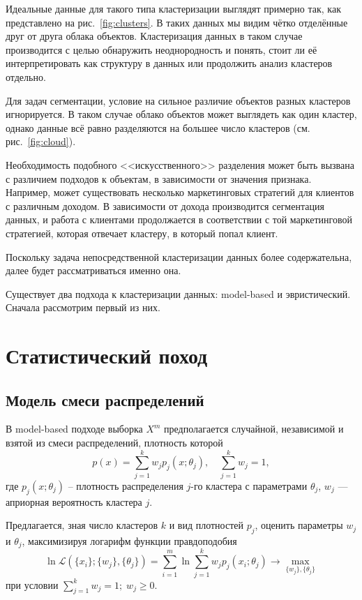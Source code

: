 \documentclass[10pt]{article}
\renewcommand{\geq}{\geqslant}
\begin{document}
Идеальные данные для такого типа кластеризации выглядят примерно так, как представлено на рис.~\ref{fig:clusters}. 
В таких данных мы видим чётко отделённые друг от друга облака объектов. Кластеризация данных в таком случае производится с целью обнаружить неоднородность и
понять, стоит ли её интерпретировать как структуру в данных или продолжить анализ кластеров отдельно.

Для задач сегментации, условие на сильное различие объектов разных кластеров игнорируется. В таком случае облако объектов может выглядеть как один кластер, 
однако данные всё равно разделяются на большее число кластеров (см. рис.~\ref{fig:cloud}). 

Необходимость подобного <<искусственного>> разделения может быть вызвана с различием подходов к объектам, в зависимости от значения признака. 
Например, может существовать несколько маркетинговых стратегий для клиентов с различным доходом. 
В зависимости от дохода производится сегментация данных, и работа с клиентами продолжается в соответствии с той маркетинговой стратегией, которая отвечает 
кластеру, в который попал клиент.

Поскольку задача непосредственной кластеризации данных более содержательна, далее будет рассматриваться именно она.

Существует два подхода к кластеризации данных: model-based и эвристический. Сначала рассмотрим первый из них. 

\section{Статистический поход}
\subsection{Модель смеси распределений}
В model-based подходе выборка $X^m$ предполагается случайной, независимой и взятой из смеси распределений, 
плотность которой 
$$p(x) = \sum_{j=1}^k w_j p_j(x;\theta_j), \quad \sum_{j=1}^k w_j = 1,$$ 
где $p_j(x;\theta_j)$ -- плотность распределения $j$-го кластера с параметрами $\theta_j$, 
$w_j$ --- априорная вероятность кластера $j$.

Предлагается, зная число кластеров $k$ и вид плотностей $p_j$, оценить параметры $w_j$ и $\theta_j$, 
максимизируя логарифм функции правдоподобия 
$$\ln \mathcal{L}(\{x_i\}; \{w_j\}, \{\theta_j\}) = \sum_{i=1}^m \ln \sum_{j=1}^k w_j p_j(x_i; \theta_j) \rightarrow \max_{\{w_j\}, \{\theta_j\}}$$ 
при условии $\sum_{j=1}^k w_j =1; \;  w_j \geq 0$.
\end{document}
